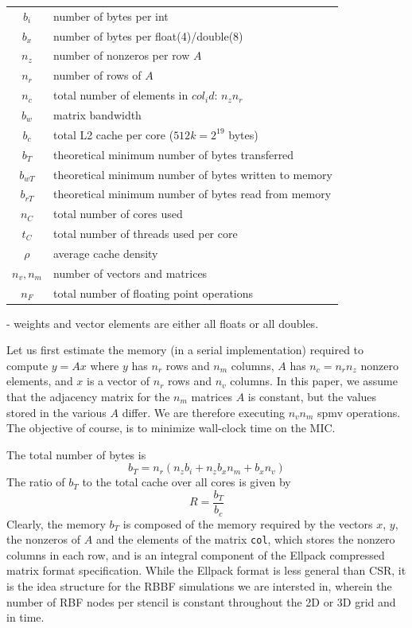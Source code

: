 \documentclass[10pt,conference,compsocconf]{IEEEtran}
\def\ttt#1{{\tt #1}}
\begin{document}
\begin{center}
\begin{tabular}{|c|l|}
\hline
$b_i$ & number of bytes per int \\
$b_x$ & number of bytes per float(4)/double(8) \\
$n_z$ & number of nonzeros per row $A$ \\
$n_r$ & number of rows of $A$ \\
$n_c$ & total number of elements in $col_id$: $n_z n_r$ \\
$b_w$ & matrix bandwidth \\
$b_c$ & total L2 cache per core ($512k=2^{19}$ bytes) \\
$b_T$ & theoretical minimum number of bytes transferred  \\
$b_{wT}$ & theoretical minimum number of bytes written to memory  \\
$b_{rT}$ & theoretical minimum number of bytes read from memory  \\
$n_C$ & total number of cores used  \\
$t_C$ & total number of threads used per core \\
$\rho$ & average cache density  \\
$n_v, n_m$ & number of vectors and matrices \\
$n_F$ & total number of floating point operations  \\
\hline
\end{tabular}
\end{center}

- weights and vector elements are either all floats or all doubles. 

Let us first estimate the memory (in a serial implementation) required to compute $y = Ax$ where $y$ has $n_r$ rows and $n_m$ columns, $A$ has
$n_c=n_r n_z$ nonzero elements, and $x$ is a vector of $n_r$ rows and 
$n_v$ columns. In this paper, we assume that the adjacency matrix for the
$n_m$ matrices $A$ is constant, but the values stored in the various $A$ differ. We are therefore executing $n_v n_m$ spmv operations. The objective of course, is to minimize wall-clock time on the MIC.

The total number of bytes is 
$$
   b_T = n_r (n_z b_i + n_z b_x n_m + b_x n_v)
$$
The ratio of $b_T$ to the total cache  over all cores is given by
$$
   R = \frac{b_T}{b_c}
$$
Clearly, the memory $b_T$ is composed of the memory required by the vectors $x$, $y$, the nonzeros of $A$ and the elements of the matrix \ttt{col}, which stores the nonzero columns in each row, and is an integral component of the Ellpack compressed matrix format specification. While the Ellpack format is less general than CSR, it is the idea structure for the RBBF simulations we are intersted in, wherein the number of RBF nodes per stencil is constant throughout the 2D or 3D grid and in time. 
\end{document}

